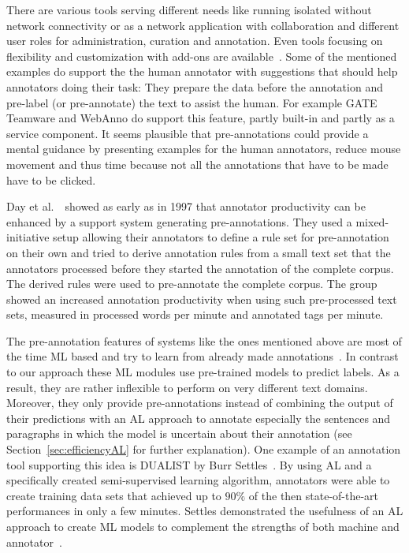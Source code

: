  There are various tools serving different needs like running isolated without network connectivity or as a network application with collaboration and different user roles for administration, curation and annotation. Even tools focusing on flexibility and customization with add-ons are available~\cite{biemann2017collaborative}. Some of the mentioned examples do support the the human annotator with suggestions that should help annotators doing their task: They prepare the data before the annotation and pre-label (or \lqq pre-annotate\rqq) the text to assist the human. For example GATE Teamware and WebAnno do support this feature, partly built-in and partly as a service component. It seems plausible that pre-annotations could provide a mental guidance by presenting examples for the human annotators, reduce mouse movement and thus time because not all the annotations that have to be made have to be clicked.

  Day et al.~\cite{day1997mixed}~showed as early as in 1997 that annotator productivity can be enhanced by a support system generating pre-annotations. They used a mixed-initiative setup allowing their annotators to define a rule set for pre-annotation on their own and tried to derive annotation rules from a small text set that the annotators processed before they started the annotation of the complete corpus. The derived rules were used to pre-annotate the complete corpus. The group showed an increased annotation productivity when using such pre-processed text sets, measured in processed words per minute and annotated tags per minute.

  The pre-annotation features of systems like the ones mentioned above are most of the time \ac{ML} based and try to learn from already made annotations~\cite{biemann2017collaborative}. In contrast to our approach these \ac{ML} modules use pre-trained models to predict labels. As a result, they are rather inflexible to perform on very different text domains. Moreover, they only provide pre-annotations instead of combining the output of their predictions with an \ac{AL} approach to annotate especially the sentences and paragraphs in which the model is uncertain about their annotation (see Section~\ref{sec:efficiencyAL} for further explanation). One example of an annotation tool supporting this idea is \ac{DUALIST} by Burr Settles~\cite{settles2011closing}. By using \ac{AL} and a specifically created semi-supervised learning algorithm, annotators were able to create training data sets that achieved up to \(90\%\) of the then state-of-the-art performances in only a few minutes. Settles demonstrated the usefulness of an \ac{AL} approach to create \ac{ML} models to complement the strengths of both machine and annotator~\cite{settles2011closing}.

